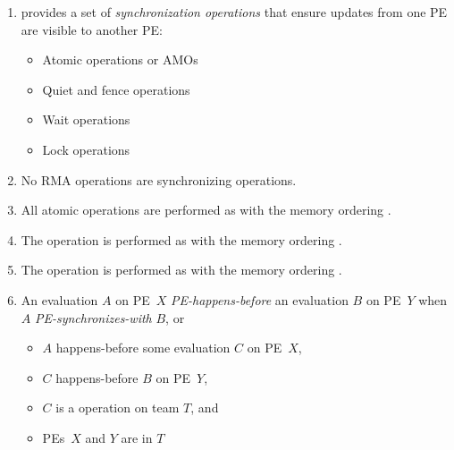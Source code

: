\begin{enumerate}

\item \openshmem provides a set of \emph{synchronization operations}
  that ensure updates from one \ac{PE} are visible
  to another \ac{PE}:

  \begin{itemize}
  \item Atomic operations or \acp{AMO}
  \item Quiet and fence operations
  \item Wait operations
  \item Lock operations
  \end{itemize}




\item No \ac{RMA} operations are synchronizing operations.

\item All \openshmem atomic operations are performed as with the
  memory ordering .


\item The  operation is performed as with the
  memory ordering .

\item The  operation is performed as with the
  memory ordering .

\item An evaluation $A$ on \ac{PE}~$X$ \emph{\ac{PE}-happens-before}
  an evaluation $B$ on \ac{PE}~$Y$ when $A$
  \emph{\ac{PE}-synchronizes-with} $B$, or
  \begin{itemize}
  \item $A$ happens-before some evaluation $C$ on \ac{PE}~$X$,
  \item $C$ happens-before $B$ on \ac{PE}~$Y$,
  \item $C$ is a  operation on
    team $T$, and
  \item \acp{PE}~$X$ and $Y$ are in $T$
  \end{itemize}


\end{enumerate}

